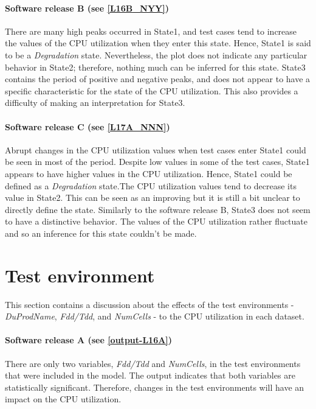 \paragraph*{Software release B (see \ref{L16B_NYY})}

There are many high peaks occurred in State1, and test cases tend
to increase the values of the CPU utilization when they enter this
state. Hence, State1 is said to be a \emph{Degradation} state. Nevertheless,
the plot does not indicate any particular behavior in State2; therefore,
nothing much can be inferred for this state. State3 contains the period
of positive and negative peaks, and does not appear to have a specific
characteristic for the state of the CPU utilization. This also provides
a difficulty of making an interpretation for State3.

\paragraph{Software release C (see \ref{L17A_NNN})}

Abrupt changes in the CPU utilization values when test cases enter
State1 could be seen in most of the period. Despite low values in
some of the test cases, State1 appears to have higher values in the
CPU utilization. Hence, State1 could be defined as a \emph{Degradation}
state.The CPU utilization values tend to decrease its value in State2.
This can be seen as an improving but it is still a bit unclear to
directly define the state. Similarly to the software release B, State3
does not seem to have a distinctive behavior. The values of the CPU
utilization rather fluctuate and so an inference for this state couldn't
be made.

\section{Test environment}

This section contains a discussion about the effects of the test environments
- \emph{DuProdName}, \emph{Fdd/Tdd}, and \emph{NumCells} - to the
CPU utilization in each dataset. 

\paragraph{Software release A (see \ref{output-L16A})}

There are only two variables, \emph{Fdd/Tdd} and \emph{NumCells},
in the test environments that were included in the model. The output
indicates that both variables are statistically significant. Therefore,
changes in the test environments will have an impact on the CPU utilization.

